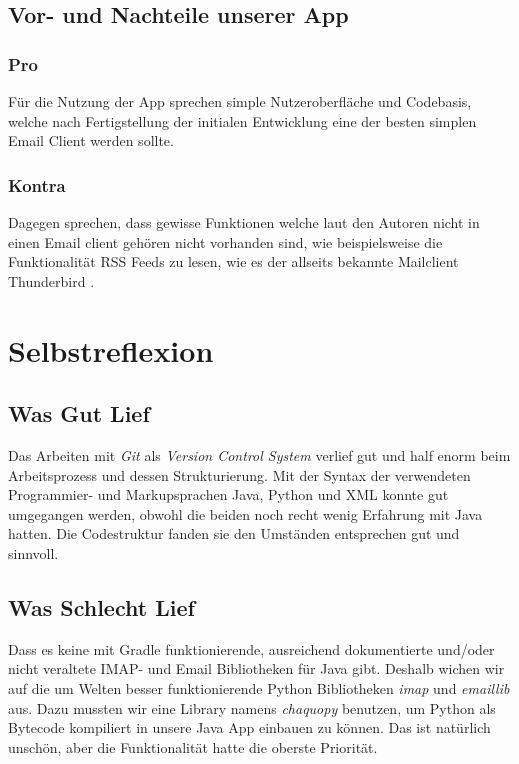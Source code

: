\documentclass[a4paper,11pt]{article}
\begin{document}
\subsection{Vor- und Nachteile unserer App}
\subsubsection{Pro}
Für die Nutzung der App sprechen simple Nutzeroberfläche und Codebasis, welche nach Fertigstellung der initialen Entwicklung eine der besten simplen Email Client werden sollte.
\subsubsection{Kontra}
Dagegen sprechen, dass gewisse Funktionen welche laut den Autoren nicht in einen Email client gehören nicht vorhanden sind, wie beispielsweise die Funktionalität RSS Feeds zu lesen, wie es der allseits bekannte Mailclient Thunderbird .\cite{thunderbird}

\section{Selbstreflexion}

\subsection{Was Gut Lief}
Das Arbeiten mit \textit{Git} als \textit{Version Control System} verlief gut und half enorm beim Arbeitsprozess und dessen Strukturierung. Mit der Syntax der verwendeten Programmier- und Markupsprachen Java, Python und XML konnte gut umgegangen werden, obwohl die beiden noch recht wenig Erfahrung mit Java hatten. Die Codestruktur fanden sie den Umständen entsprechen gut und sinnvoll.
\subsection{Was Schlecht Lief}
Dass es keine mit Gradle funktionierende, ausreichend dokumentierte und/oder nicht veraltete IMAP- und Email Bibliotheken für Java gibt. Deshalb wichen wir auf die um Welten besser funktionierende Python Bibliotheken \textit{imap} und \textit{emaillib} aus. Dazu mussten wir eine Library namens \textit{chaquopy} benutzen, um Python als Bytecode kompiliert in unsere Java App einbauen zu können. Das ist natürlich unschön, aber die Funktionalität hatte die oberste Priorität.\\
\end{document}
